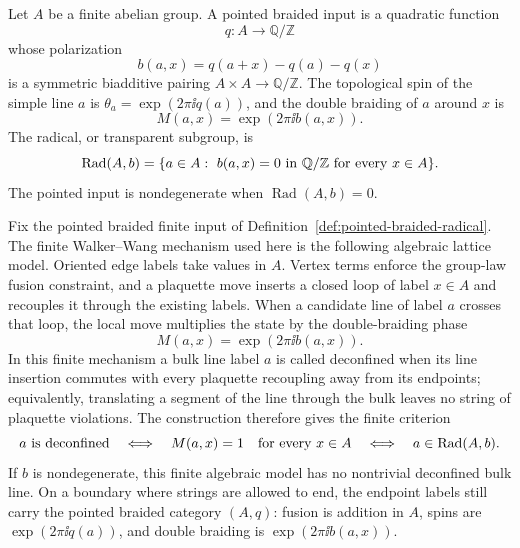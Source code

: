 \begin{definition}
\label{def:pointed-braided-radical}
Let \(A\) be a finite abelian group.  A pointed braided input is a quadratic
function
\[
  q:A\to\mathbb Q/\mathbb Z
\]
whose polarization
\begin{equation}
  b(a,x)=q(a+x)-q(a)-q(x)
  \label{eq:pointed-braiding-polarization}
\end{equation}
is a symmetric biadditive pairing \(A\times A\to\mathbb Q/\mathbb Z\).  The
topological spin of the simple line \(a\) is \(\theta_a=\exp(2\pi\ii q(a))\),
and the double braiding of \(a\) around \(x\) is
\[
  M(a,x)=\exp(2\pi\ii b(a,x)).
\]
The radical, or transparent subgroup, is
\begin{equation}
  \operatorname{Rad}(A,b)
  =
  \{a\in A:\ b(a,x)=0\ {\rm in}\ \mathbb Q/\mathbb Z
  \ {\rm for\ every}\ x\in A\}.
  \label{eq:pointed-radical}
\end{equation}
The pointed input is nondegenerate when \(\operatorname{Rad}(A,b)=0\).
\end{definition}

\begin{construction}
\label{cons:pointed-walker-wang-boundary-mechanism}
Fix the pointed braided finite input of
Definition~\ref{def:pointed-braided-radical}.  The finite Walker--Wang
mechanism used here is the following algebraic lattice model.  Oriented edge
labels take values in \(A\).  Vertex terms enforce the group-law fusion
constraint, and a plaquette move inserts a closed loop of label \(x\in A\) and
recouples it through the existing labels.  When a candidate line of label
\(a\) crosses that loop, the local move multiplies the state by the
double-braiding phase
\begin{equation}
  M(a,x)=\exp(2\pi\ii b(a,x)).
  \label{eq:pointed-ww-crossing-phase}
\end{equation}
In this finite mechanism a bulk line label \(a\) is called deconfined when its
line insertion commutes with every plaquette recoupling away from its endpoints;
equivalently, translating a segment of the line through the bulk leaves no
string of plaquette violations.  The construction therefore gives the finite
criterion
\begin{equation}
  a\hbox{ is deconfined}
  \quad\Longleftrightarrow\quad
  M(a,x)=1\quad\hbox{for every }x\in A
  \quad\Longleftrightarrow\quad
  a\in\operatorname{Rad}(A,b).
  \label{eq:pointed-ww-radical-criterion}
\end{equation}
If \(b\) is nondegenerate, this finite algebraic model has no nontrivial
deconfined bulk line.  On a boundary where strings are allowed to end, the
endpoint labels still carry the pointed braided category \((A,q)\): fusion is
addition in \(A\), spins are \(\exp(2\pi\ii q(a))\), and double braiding is
\(\exp(2\pi\ii b(a,x))\).
\end{construction}

